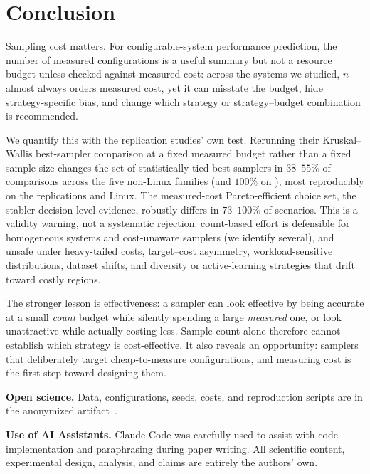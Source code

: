 \section{Conclusion}
\label{sec:conclusion}

Sampling cost matters. For configurable-system performance prediction, the
number of measured configurations is a useful summary but not a resource budget
unless checked against measured cost: across the systems we studied,
$n$ almost always orders measured cost, yet it can misstate the budget, hide
strategy-specific bias, and change which strategy or strategy--budget combination
is recommended.

We quantify this with the replication studies' own test. Rerunning their
Kruskal--Wallis best-sampler comparison at a fixed measured budget rather than a
fixed sample size changes the set of statistically tied-best samplers in
$38$--$55\%$ of comparisons across the five non-Linux families (and $100\%$ on
\StudyLinux), most reproducibly on the replications and Linux. The measured-cost
Pareto-efficient choice set, the stabler decision-level evidence, robustly differs
in $73$--$100\%$ of scenarios. This is a validity warning, not a systematic rejection: count-based
effort is defensible for homogeneous systems and cost-unaware samplers (we identify
several), and unsafe under heavy-tailed costs, target--cost asymmetry,
workload-sensitive distributions, dataset shifts, and diversity or
active-learning strategies that drift toward costly regions.

The stronger lesson is effectiveness: a sampler can look effective by being
accurate at a small \emph{count} budget while silently spending a large
\emph{measured} one, or look unattractive while actually costing less. Sample
count alone therefore cannot establish which strategy is cost-effective. It also
reveals an opportunity: samplers that deliberately target cheap-to-measure
configurations, and measuring cost is the first step toward designing them.

\smallskip\noindent\textbf{Open science.} Data, configurations, seeds, costs, and
reproduction scripts are in the anonymized artifact~\cite{artifact}.

\smallskip\noindent\textbf{Use of AI Assistants.} Claude Code was carefully used to assist with code
implementation and paraphrasing during paper writing. All scientific content,
experimental design, analysis, and claims are entirely the authors' own.
